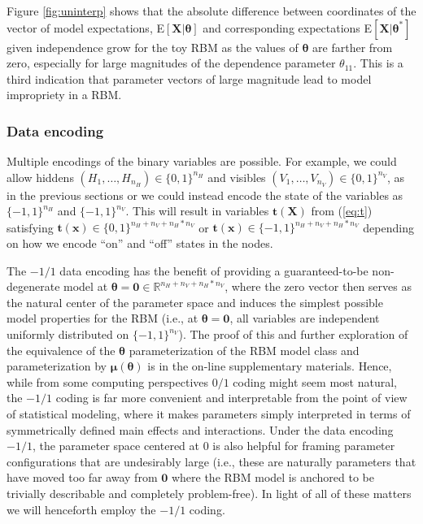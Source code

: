 \documentclass[12pt]{article}
\theoremstyle{definition}
\newcommand{\nv}{{n_{\scriptscriptstyle V}}}
\newcommand{\nh}{{n_{\scriptscriptstyle H}}}
\begin{document}
Figure \ref{fig:uninterp} shows that the absolute difference between
coordinates of the vector of model expectations,
E\(\left[\boldsymbol X | \boldsymbol \theta\right]\) and corresponding
expectations E\(\left[\boldsymbol X | \boldsymbol \theta^*\right ]\)
given independence grow for the toy RBM as the values of
\(\boldsymbol \theta\) are farther from zero, especially for large
magnitudes of the dependence parameter \(\theta_{11}\). This is a third
indication that parameter vectors of large magnitude lead to model
impropriety in a RBM.

\subsubsection{Data encoding}\label{data-encoding}

Multiple encodings of the binary variables are possible. For example, we
could allow hiddens \((H_1, \dots, H_\nh) \in \{0,1\}^\nh\) and visibles
\((V_1, \dots, V_\nv) \in \{0,1\}^\nv\), as in the previous sections or
we could instead encode the state of the variables as \(\{-1,1\}^\nh\)
and \(\{-1,1\}^\nv\). This will result in variables
\(\boldsymbol t(\boldsymbol X)\) from (\eqref{eq:t}) satisfying
\(\boldsymbol t(\boldsymbol x) \in \{0,1\}^{\nh + \nv + \nh*\nv}\) or
\(\boldsymbol t(\boldsymbol x) \in \{-1,1\}^{\nh + \nv + \nh*\nv}\)
depending on how we encode ``on'' and ``off'' states in the nodes.

The \(-1/1\) data encoding has the benefit of providing a
guaranteed-to-be non-degenerate model at
\(\boldsymbol \theta = \boldsymbol 0 \in \mathbb{R}^{\nh + \nv + \nh*\nv}\),
where the zero vector then serves as the natural center of the parameter
space and induces the simplest possible model properties for the RBM
(i.e., at \(\boldsymbol \theta = \boldsymbol 0\), all variables are
independent uniformly distributed on \(\{-1,1\}^\nv\)). The proof of
this and further exploration of the equivalence of the
\(\boldsymbol \theta\) parameterization of the RBM model class and
parameterization by \(\boldsymbol \mu(\boldsymbol \theta)\) is in the
on-line supplementary materials. Hence, while from some computing
perspectives \(0/1\) coding might seem most natural, the \(-1/1\) coding
is far more convenient and interpretable from the point of view of
statistical modeling, where it makes parameters simply interpreted in
terms of symmetrically defined main effects and interactions. Under the
data encoding \(-1/1\), the parameter space centered at 0 is also
helpful for framing parameter configurations that are undesirably large
(i.e., these are naturally parameters that have moved too far away from
\(\bm{0}\) where the RBM model is anchored to be trivially describable
and completely problem-free). In light of all of these matters we will
henceforth employ the \(-1/1\) coding.
\end{document}
